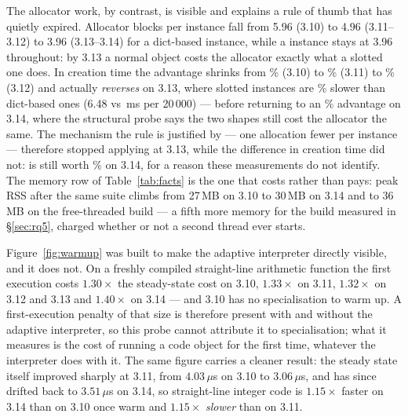 The allocator work, by contrast, is visible and explains a rule of thumb that has quietly
expired. Allocator blocks per instance fall from 5.96 (3.10) to 4.96 (3.11--3.12) to 3.96
(3.13--3.14) for a dict-based instance, while a  instance stays at 3.96
throughout: by 3.13 a normal object costs the allocator exactly what a slotted one does. In
creation time the  advantage shrinks from \% (3.10) to \% (3.11) to \%
(3.12) and actually \emph{reverses} on 3.13, where slotted instances are \% slower than
dict-based ones (6.48 vs \,ms per 20\,000) --- before returning to an \% advantage on 3.14,
where the structural probe says the two shapes still cost the allocator the same. The mechanism
the rule is justified by --- one allocation fewer per instance --- therefore stopped
applying at 3.13, while the difference in creation time did not:  is still
worth \% on 3.14, for a reason these measurements do not identify.
The memory row of Table~\ref{tab:facts} is the one that costs rather than pays: peak RSS
after the same suite climbs from 27\,MB on 3.10 to 30\,MB on 3.14 and to 36\,MB on the
free-threaded build --- a fifth more memory for the build measured in \S\ref{sec:rq5}, charged
whether or not a second thread ever starts.

Figure~\ref{fig:warmup} was built to make the adaptive interpreter directly visible, and it does
not. On a freshly compiled straight-line arithmetic function the first execution costs
$1.30\times$ the steady-state cost on 3.10, $1.33\times$ on 3.11, $1.32\times$ on 3.12 and 3.13
and $1.40\times$ on 3.14 --- and 3.10 has no specialisation to warm up. A first-execution penalty
of that size is therefore present with and without the adaptive interpreter, so this probe
cannot attribute it to specialisation; what it measures is the cost of running a code object for
the first time, whatever the interpreter does with it. The same figure carries a cleaner result:
the steady state itself improved sharply at 3.11, from $4.03\,\mu$s on 3.10 to $3.06\,\mu$s, and
has since drifted back to $3.51\,\mu$s on 3.14, so straight-line integer code is $1.15\times$
faster on 3.14 than on 3.10 once warm and $1.15\times$ \emph{slower} than on 3.11.

